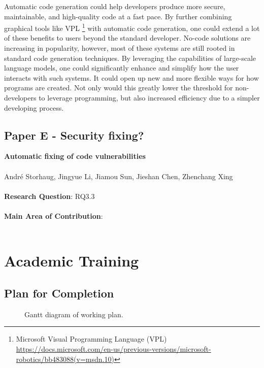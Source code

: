 \documentclass{article}
\begin{document}
Automatic code generation could help developers produce more secure, maintainable, and high-quality code at a fast pace. By further combining graphical tools like VPL \footnote{Microsoft Visual Programming Language (VPL) \url{https://docs.microsoft.com/en-us/previous-versions/microsoft-robotics/bb483088(v=msdn.10)}} with automatic code generation, one could extend a lot of these benefits to users beyond the standard developer.  No-code solutions are increasing in popularity, however, most of these systems are still rooted in standard code generation techniques. By leveraging the capabilities of large-scale language models, one could significantly enhance and simplify how the user interacts with such systems. It could open up new and more flexible ways for how programs are created. Not only would this greatly lower the threshold for non-developers to leverage programming, but also increased efficiency due to a simpler developing process.


\subsection{Paper E - Security fixing?}

\textbf{Automatic fixing of code vulnerabilities}\\\\
\noindent Andr\'e Storhaug, Jingyue Li, Jiamou Sun, Jieshan Chen, Zhenchang Xing\\\\
\noindent \textbf{Research Question}: RQ3.3\\\\
\noindent \textbf{Main Area of Contribution}: \\\\



\section{Academic Training}

\subsection{Plan for Completion}
\lipsum[1-2]
\begin{figure}[htpb]
	\clearpage
	
	\caption{Gantt diagram of working plan.}
	\label{fig:gantt-diagram-progress-plan}
\end{figure}
\end{document}
